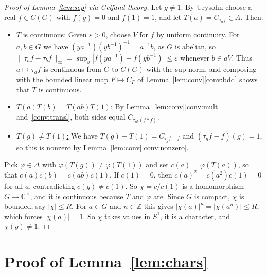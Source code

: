 \documentclass[11pt]{article}
\newcommand{\Z}{\mathbb{Z}}
\newcommand{\C}{\mathbb{C}}
\begin{document}
\begin{proof}[Proof of Lemma~\ref{lem:sep} via Gelfand theory]
Let $g \neq 1$. By Urysohn choose a real $f \in C(G)$ with $f(g) = 0$ and $f(1) = 1$, and let $T(a) = C_{\tau_a f} \in A$. Then:
\begin{itemize}
  \item \uline{$T$ is continuous:} Given $\varepsilon > 0$, choose $V$ for $f$ by uniform continuity. For $a, b \in G$ we have $(ya^{-1})(yb^{-1})^{-1} = a^{-1}b$, as $G$ is abelian, so $\|\tau_a f - \tau_b f\|_\infty = \sup_y |f(ya^{-1}) - f(yb^{-1})| \le \varepsilon$ whenever $b \in aV$. Thus $a \mapsto \tau_a f$ is continuous from $G$ to $C(G)$ with the sup norm, and composing with the bounded linear map $F \mapsto C_F$ of Lemma~\ref{lem:conv}\ref{conv:bdd} shows that $T$ is continuous.
  \item \uline{$T(a)T(b) = T(ab)T(1)$:} By Lemma~\ref{lem:conv}\ref{conv:mult} and~\ref{conv:transl}, both sides equal $C_{\tau_{ab}(f*f)}$.
  \item \uline{$T(g) \neq T(1)$:} We have $T(g) - T(1) = C_{\tau_g f - f}$ and $(\tau_g f - f)(g) = 1$, so this is nonzero by Lemma~\ref{lem:conv}\ref{conv:nonzero}.
\end{itemize}
Pick $\varphi \in \Delta$ with $\varphi(T(g)) \neq \varphi(T(1))$ and set $c(a) = \varphi(T(a))$, so that $c(a)c(b) = c(ab)c(1)$. If $c(1) = 0$, then $c(a)^2 = c(a^2)c(1) = 0$ for all $a$, contradicting $c(g) \neq c(1)$. So $\chi = c/c(1)$ is a homomorphism $G \to \C^\times$, and it is continuous because $T$ and $\varphi$ are. Since $G$ is compact, $\chi$ is bounded, say $|\chi| \le R$. For $a \in G$ and $n \in \Z$ this gives $|\chi(a)|^n = |\chi(a^n)| \le R$, which forces $|\chi(a)| = 1$. So $\chi$ takes values in $S^1$, it is a character, and $\chi(g) \neq 1$.
\end{proof}

\appendix
\section{Proof of Lemma~\ref{lem:chars}}\label{app:chars}
\end{document}
